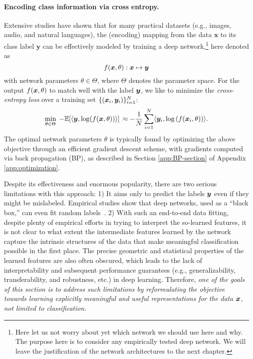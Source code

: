 \documentclass[../../book-main.tex]{subfiles}
\begin{document}
\paragraph{Encoding class information via cross entropy.}  Extensive studies have shown that for many practical datasets (e.g., images, audio, and natural languages), the (encoding) mapping from the data $\bm{x}$ to its class label $\bm{y}$ can be effectively modeled by training a deep network,\footnote{Here let us not worry about yet which network we should use here and why. The purpose here is to consider any empirically tested deep network. We will leave the justification of the network architectures to the next chapter.} here denoted as $$f(\bm{x}, \theta):\bm{x} \mapsto \bm{y}$$ with network parameters $\theta \in \Theta$, where $\Theta$ denotes the parameter space. For the output $f(\bm{x}, \theta)$ to match well with the label $\bm{y}$, we like to  minimize the {\em cross-entropy loss} over a training set $\{(\bm{x}_i, \bm{y}_i)\}_{i=1}^N$: 
\begin{equation}
   \min_{\theta \in \Theta} \; - \mathbb{E}[\langle \bm{y}, \log(f(\bm{x}, \theta)) \rangle] \, \approx - \frac{1}{N}\sum_{i=1}^N \langle \bm{y}_i, \log\left(f(\bm{x}_i, \theta)\right) \rangle.
   \label{chap4-eqn:cross-entropy}
\end{equation}
The optimal network parameters $\theta $ is typically found by optimizing the above objective through an efficient gradient descent scheme, with gradients computed via back propagation (BP), as described in Section \ref{app:BP-section} of Appendix \ref{app:optimization}.

Despite its effectiveness and enormous popularity, there are two serious limitations with this approach:  1) It aims only to predict the labels $\bm{y}$ even if they might be mislabeled. Empirical studies show that deep networks, used as a ``black box,'' can even fit random labels~\cite{zhang2017understanding}.
2) With such an end-to-end data fitting,
despite plenty of empirical efforts in trying to interpret the so-learned
features, %
it is not clear to what extent the intermediate features learned by the network capture the intrinsic structures of the data that make meaningful classification possible in the first place. The precise geometric and statistical properties of the learned features are also often obscured, which leads to the lack of interpretability and subsequent performance guarantees (e.g., generalizability, transferability, and robustness, etc.) in deep learning.
Therefore, {\em one of the goals of this section is to address such limitations by reformulating the objective towards learning explicitly meaningful and useful representations for the data $\bm{x}$, not limited to classification.}
\end{document}
